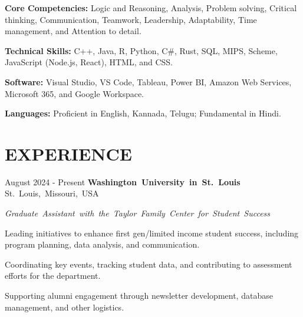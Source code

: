 \documentclass[10pt, letterpaper]{article}
\begin{document}
\begin{onecolentry}
    \textbf{Core Competencies:} Logic and Reasoning, Analysis, Problem solving, Critical thinking, Communication, Teamwork, Leadership, Adaptability, Time management, and Attention to detail.
\end{onecolentry}
\vspace{\highlightSpacing}
\begin{onecolentry}
    \textbf{Technical Skills:} C++, Java, R, Python, C\#, Rust, SQL, MIPS, Scheme, JavaScript (Node.js, React), HTML, and CSS.
\end{onecolentry}
\vspace{\highlightSpacing}
\begin{onecolentry}
    \textbf{Software:} Visual Studio, VS Code, Tableau, Power BI, Amazon Web Services, Microsoft 365, and Google Workspace.
\end{onecolentry}
\vspace{\highlightSpacing}
\begin{onecolentry}
    \textbf{Languages:} Proficient in English, Kannada, Telugu; Fundamental in Hindi.
\end{onecolentry}

\section{EXPERIENCE}

\begin{twocolentry}{August 2024 - Present}
    \mbox{\textbf{Washington University in St. Louis}}
    \kern {}
    \AND
    \kern {}
    \mbox{St. Louis, Missouri, USA}
\end{twocolentry}

\vspace{\highlightSpacing}
\mbox{\textit{Graduate Assistant with the Taylor Family Center for Student Success}}
\begin{onecolentry}
    \begin{highlights}
        \item Leading initiatives to enhance first gen/limited income student success, including program planning, data analysis, and communication.
        \item Coordinating key events, tracking student data, and contributing to assessment efforts for the department.
        \item Supporting alumni engagement through newsletter development, database management, and other logistics.
    \end{highlights}
\end{onecolentry}
\end{document}

